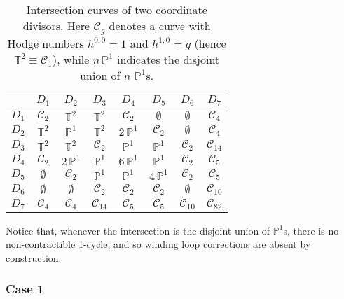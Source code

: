 \documentclass[11pt,a4paper]{article}
\def\T{{\mathbb T}}
\def\P{{\mathbb P}}
\newcommand{\mc}{\mathcal}
\begin{document}
\begin{table}[H]
  \centering
 \begin{tabular}{|c|c|c|c|c|c|c|c|}
\hline
  & $D_1$  & $D_2$  & $D_3$  & $D_4$  & $D_5$ & $D_6$  & $D_7$  \\
    \hline
		\hline
 $D_1$ & $\mc{C}_2$  &  $\T^2$      &  $\T^2$        &  $\mc{C}_2$   &  $\emptyset$  &  $\emptyset$   &  $\mc{C}_4$      \\
 $D_2$ & $\T^2$      &  $\P^1$      &  $\T^2$        &  $2\,\P^1$    &  $\mc{C}_2$   &  $\emptyset$   &  $\mc{C}_4$      \\
 $D_3$ & $\T^2$      &  $\T^2$      &  $\mc{C}_2$    &  $\P^1$       &  $\P^1$       &  $\mc{C}_2$    &  $\mc{C}_{14}$   \\
 $D_4$ & $\mc{C}_2$  &  $2\,\P^1$   &  $\P^1$        &  $6\, \P^1$   &  $\P^1$       &  $\mc{C}_2$    &  $\mc{C}_5$      \\
 $D_5$ & $\emptyset$ &  $\mc{C}_2$  &  $\P^1$        &  $\P^1$       &  $4\,\P^1$    &  $\mc{C}_2$    &  $\mc{C}_5$      \\
 $D_6$ & $\emptyset$ &  $\emptyset$ &  $\mc{C}_2$    &  $\mc{C}_2$   &  $\mc{C}_2$   &  $\emptyset$   &  $\mc{C}_{10}$   \\
 $D_7$ & $\mc{C}_4$  &  $\mc{C}_4$  &  $\mc{C}_{14}$ &  $\mc{C}_5$   &  $\mc{C}_5$   &  $\mc{C}_{10}$ &  $\mc{C}_{82}$   \\
    \hline
  \end{tabular}
  \caption{Intersection curves of two coordinate divisors. Here $\mc{C}_g$ denotes a curve with Hodge numbers $h^{0,0} = 1$ and $h^{1,0} = g$ (hence $\T^2\equiv \mc{C}_1$), while $n\,\P^1$ indicates the disjoint union of $n$ $\P^1$s.} 
\label{Tab4}
\end{table}

Notice that, whenever the intersection is the disjoint union of $\P^1$s, there is no non-contractible 1-cycle, and so winding loop corrections are absent by construction. 

\subsubsection{Case 1}
\end{document}
